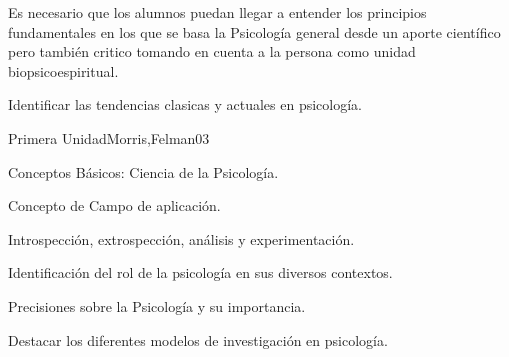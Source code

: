 \begin{syllabus}


\begin{justification}
Es necesario que los alumnos puedan llegar a entender los principios fundamentales en  los que se basa la Psicología general desde un aporte científico pero también critico tomando en cuenta a la persona como unidad biopsicoespiritual.
\end{justification}

\begin{goals}
\item Identificar las tendencias clasicas y actuales en psicología.
\end{goals}

\begin{outcomes}
\end{outcomes}

\begin{unit}{Primera Unidad}{Morris,Felman}{0}{3}
\begin{topics}
	\item Conceptos Básicos: Ciencia de la Psicología.
	\item Concepto de Campo de aplicación.
	\item Introspección, extrospección, análisis y experimentación.
\end{topics}
\begin{unitgoals}
	\item Identificación del rol de la psicología en sus diversos contextos.
	\item Precisiones sobre la Psicología y su importancia.
	\item Destacar los diferentes modelos de investigación en psicología.
\end{unitgoals}
\end{unit}


\end{syllabus}
